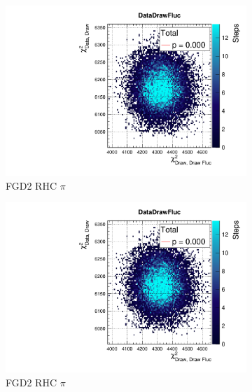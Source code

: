 \begin{figure}[h]
	\begin{subfigure}[t]{0.32\textwidth}
		\includegraphics[width=\textwidth, trim={20mm 6mm 4mm 11mm}, clip,page=142]{figures/mach3/2018/data/2018a_FixedCov_RedCov_Mpi_Data_merge_PostPredStore_FullLLH_procs}
		\caption{FGD2 RHC $\pi$}
	\end{subfigure}
	\begin{subfigure}[t]{0.32\textwidth}
		\includegraphics[width=\textwidth, trim={20mm 6mm 4mm 11mm}, clip,page=151]{figures/mach3/2018/data/2018a_FixedCov_RedCov_Mpi_Data_merge_PostPredStore_FullLLH_procs}
		\caption{FGD2 RHC $\pi$}
	\end{subfigure}
	\begin{subfigure}[t]{0.32\textwidth}

\end{subfigure}
\end{figure}
